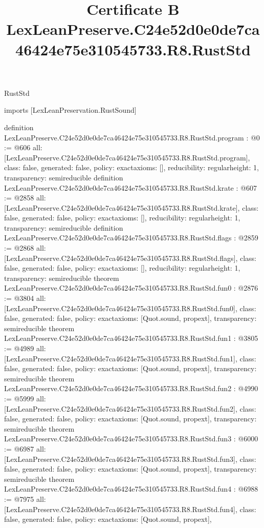 \begin{lexlean}{RustStd}
\title{Certificate B LexLeanPreserve.C24e52d0e0de7ca46424e75e310545733.R8.RustStd}
\begin{coremodule}
imports [LexLeanPreservation.RustSound]

definition LexLeanPreserve.C24e52d0e0de7ca46424e75e310545733.R8.RustStd.program : @0 := @606 {
  all: [LexLeanPreserve.C24e52d0e0de7ca46424e75e310545733.R8.RustStd.program],
  class: false,
  generated: false,
  policy: exact{axioms: []},
  reducibility: regular{height: 1},
  transparency: semireducible
}
definition LexLeanPreserve.C24e52d0e0de7ca46424e75e310545733.R8.RustStd.krate : @607 := @2858 {
  all: [LexLeanPreserve.C24e52d0e0de7ca46424e75e310545733.R8.RustStd.krate],
  class: false,
  generated: false,
  policy: exact{axioms: []},
  reducibility: regular{height: 1},
  transparency: semireducible
}
definition LexLeanPreserve.C24e52d0e0de7ca46424e75e310545733.R8.RustStd.flags : @2859 := @2868 {
  all: [LexLeanPreserve.C24e52d0e0de7ca46424e75e310545733.R8.RustStd.flags],
  class: false,
  generated: false,
  policy: exact{axioms: []},
  reducibility: regular{height: 1},
  transparency: semireducible
}
theorem LexLeanPreserve.C24e52d0e0de7ca46424e75e310545733.R8.RustStd.fun0 : @2876 := @3804 {
  all: [LexLeanPreserve.C24e52d0e0de7ca46424e75e310545733.R8.RustStd.fun0],
  class: false,
  generated: false,
  policy: exact{axioms: [Quot.sound, propext]},
  transparency: semireducible
}
theorem LexLeanPreserve.C24e52d0e0de7ca46424e75e310545733.R8.RustStd.fun1 : @3805 := @4989 {
  all: [LexLeanPreserve.C24e52d0e0de7ca46424e75e310545733.R8.RustStd.fun1],
  class: false,
  generated: false,
  policy: exact{axioms: [Quot.sound, propext]},
  transparency: semireducible
}
theorem LexLeanPreserve.C24e52d0e0de7ca46424e75e310545733.R8.RustStd.fun2 : @4990 := @5999 {
  all: [LexLeanPreserve.C24e52d0e0de7ca46424e75e310545733.R8.RustStd.fun2],
  class: false,
  generated: false,
  policy: exact{axioms: [Quot.sound, propext]},
  transparency: semireducible
}
theorem LexLeanPreserve.C24e52d0e0de7ca46424e75e310545733.R8.RustStd.fun3 : @6000 := @6987 {
  all: [LexLeanPreserve.C24e52d0e0de7ca46424e75e310545733.R8.RustStd.fun3],
  class: false,
  generated: false,
  policy: exact{axioms: [Quot.sound, propext]},
  transparency: semireducible
}
theorem LexLeanPreserve.C24e52d0e0de7ca46424e75e310545733.R8.RustStd.fun4 : @6988 := @7975 {
  all: [LexLeanPreserve.C24e52d0e0de7ca46424e75e310545733.R8.RustStd.fun4],
  class: false,
  generated: false,
  policy: exact{axioms: [Quot.sound, propext]},
}
\end{coremodule}
\end{lexlean}
